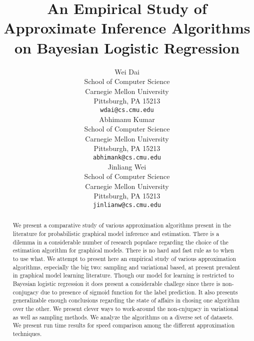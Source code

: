 \documentclass{article}
\title{An Empirical Study of Approximate Inference Algorithms on Bayesian
Logistic Regression}
\author{
Wei Dai \\
School of Computer Science \\
Carnegie Mellon University\\
Pittsburgh, PA 15213\\
\texttt{wdai@cs.cmu.edu}\\
\And
Abhimanu Kumar \\
School of Computer Science \\
Carnegie Mellon University\\
Pittsburgh, PA 15213\\
\texttt{abhimank@cs.cmu.edu}\\
\And
Jinliang Wei \\
School of Computer Science \\
Carnegie Mellon University\\
Pittsburgh, PA 15213\\
\texttt{jinlianw@cs.cmu.edu}\\
}
\begin{document}
\maketitle

\begin{abstract}
We present a comparative study of various approximation algorithms present in
the literature for probabilistic graphical model inference and estimation. There
is a dilemma in a considerable number of research populace regarding the choice
of the estimation algorithm for graphical models. There is no hard and
fast rule as to when to use what. We attempt to present here an empirical study of
various approximation algorithms, especially the big two: sampling
and variational based, at present prevalent in graphical model learning
literature.
Though our model for learning is restricted to Bayesian logistic regression it does present a
considerable challege since there is non-conjugacy due to presence of sigmoid
function for the label prediction. It also presents generalizable enough
conclusions regarding the state of affairs in chosing one algorithm over
the other. We present clever ways to work-around the non-cnjugacy in variational as
well as sampling methods. We analyze the algorithms on a diverse set 
of datasets. We present run time results for speed comparison among the
different approximation techniques. 
\end{abstract}

\setcounter{page}{1}











\end{document}
